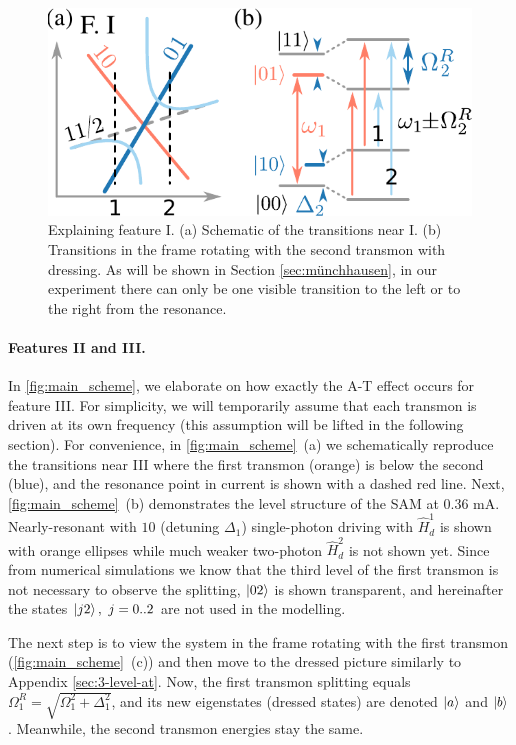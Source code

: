 \documentclass[%
 prx,
 amsmath,amssymb,
 reprint,%
]{revtex4-1}
\begin{document}
\begin{figure}
	\label{fig:main_scheme}
\end{figure}

\begin{figure}
	\includegraphics[width=.9\linewidth]{topo_scheme}
	\caption{Explaining feature I. (a) Schematic of the transitions near I. (b) Transitions in the frame rotating with the second transmon with dressing. As will be shown in Section \ref{sec:münchhausen}, in our experiment there can only be one visible transition to the left or to the right from the resonance.}
	\label{fig:featureI}
\end{figure} 

\paragraph{Features II and III.}  

In \autoref{fig:main_scheme}, we elaborate on how exactly the A-T effect occurs for feature III. For simplicity, we will temporarily assume that each transmon is driven at its own frequency (this assumption will be lifted in the following section). For convenience, in \autoref{fig:main_scheme}~(a) we schematically reproduce the transitions near III where the first transmon (orange) is below the second (blue), and the resonance point in current is shown with a dashed red line. Next, \autoref{fig:main_scheme}~(b) demonstrates the level structure of the SAM at 0.36 mA. Nearly-resonant with $10$ (detuning $\Delta_1$) single-photon driving with $\hat H_d^1$ is shown with orange ellipses while much weaker two-photon $\hat H_d^2$ is not shown yet. Since from numerical simulations we know that the third level of the first transmon is not necessary to observe the splitting, $\ket{02}$ is shown transparent, and hereinafter the states $\ket{j2},\ j=0..2$ are not used in the modelling.

The next step is to view the system in the frame rotating with the first transmon (\autoref{fig:main_scheme}~(c)) and then move to the  dressed picture similarly to Appendix \ref{sec:3-level-at}. Now, the first transmon splitting equals $\Omega_{1}^R = \sqrt{\Omega_1^2+\Delta_1^2}$, and its new eigenstates (dressed states) are denoted $\ket{a}$ and $\ket{b}$. Meanwhile, the second transmon energies stay the same.
\end{document}
